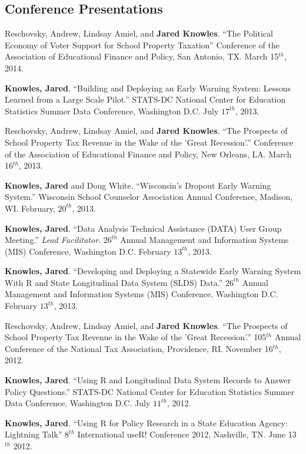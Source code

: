 \documentclass[margin,line]{res}
\begin{document}
\begin{resume}
\vspace*{5mm}

\section{\sc Conference Presentations}

Reschovsky, Andrew, Lindsay Amiel, and \textbf{Jared Knowles}. ``The Political Economy of Voter Support for School Property Taxation'' Conference of the Association of Educational Finance and Policy, San Antonio, TX. March 15$^{th}$, 2014. 

\textbf{Knowles, Jared}. ``Building and Deploying an Early Warning System: Lessons Learned from a Large Scale Pilot.'' STATS-DC National Center for Education Statistics Summer Data Conference, Washington D.C. July $17^{th}$, 2013.

Reschovsky, Andrew, Lindsay Amiel, and \textbf{Jared Knowles}. ``The Prospects of School Property Tax Revenue in the Wake of the 'Great Recession'.'' Conference of the Association of Educational Finance and Policy, New Orleans, LA. March 16$^{th}$, 2013. 

\textbf{Knowles, Jared} and Doug White. ``Wisconsin's Dropout Early Warning System.'' Wisconsin School Counselor Association Annual Conference, Madison, WI. February, $20^{th}$, 2013. 

\textbf{Knowles, Jared}. ``Data Analysis Technical Assistance (DATA) User Group Meeting.'' \emph{Lead Facilitator}. $26^{th}$ Annual Management and Information Systems (MIS) Conference, Washington D.C. February $13^{th}$, 2013.

\textbf{Knowles, Jared}. ``Developing and Deploying a Statewide Early Warning System With R and State Longitudinal Data System (SLDS) Data.'' $26^{th}$ Annual Management and Information Systems (MIS) Conference, Washington D.C. February $13^{th}$, 2013.

Reschovsky, Andrew, Lindsay Amiel, and \textbf{Jared Knowles}. ``The Prospects of School Property Tax Revenue in the Wake of the 'Great Recession'.'' 105$^{th}$ Annual Conference of the National Tax Association, Providence, RI. November 16$^{th}$, 2012. 

\textbf{Knowles, Jared}. ``Using R and Longitudinal Data System Records to Answer Policy Questions.'' STATS-DC National Center for Education Statistics Summer Data Conference, Washington D.C. July $11^{th}$, 2012.

\textbf{Knowles, Jared}. ``Using R for Policy Research in a State Education Agency: Lightning Talk'' $8^{th}$ International useR! Conference 2012, Nashville, TN. June 13$^{th}$ 2012.


\end{resume}
\end{document}
